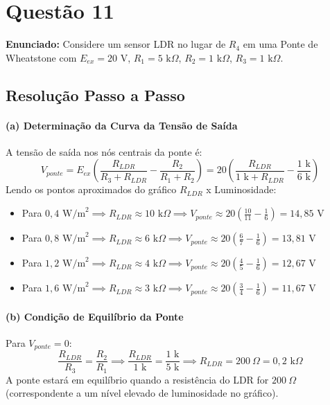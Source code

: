 \section*{Questão 11}
\textbf{Enunciado:} Considere um sensor LDR no lugar de $R_4$ em uma Ponte de Wheatstone com $E_{ex} = 20\text{ V}$, $R_1 = 5\text{ k}\Omega$, $R_2 = 1\text{ k}\Omega$, $R_3 = 1\text{ k}\Omega$.

\subsection*{Resolução Passo a Passo}

\paragraph{(a) Determinação da Curva da Tensão de Saída}
A tensão de saída nos nós centrais da ponte é:
\begin{equation*}
    V_{ponte} = E_{ex} \left( \frac{R_{LDR}}{R_3 + R_{LDR}} - \frac{R_2}{R_1 + R_2} \right) = 20 \left( \frac{R_{LDR}}{1\text{ k} + R_{LDR}} - \frac{1\text{ k}}{6\text{ k}} \right)
\end{equation*}
Lendo os pontos aproximados do gráfico $R_{LDR}$ x Luminosidade:
\begin{itemize}
    \item Para $0{,}4\text{ W/m}^2 \implies R_{LDR} \approx 10\text{ k}\Omega \implies V_{ponte} \approx 20 \left( \frac{10}{11} - \frac{1}{6} \right) = 14{,}85\text{ V}$
    \item Para $0{,}8\text{ W/m}^2 \implies R_{LDR} \approx 6\text{ k}\Omega \implies V_{ponte} \approx 20 \left( \frac{6}{7} - \frac{1}{6} \right) = 13{,}81\text{ V}$
    \item Para $1{,}2\text{ W/m}^2 \implies R_{LDR} \approx 4\text{ k}\Omega \implies V_{ponte} \approx 20 \left( \frac{4}{5} - \frac{1}{6} \right) = 12{,}67\text{ V}$
    \item Para $1{,}6\text{ W/m}^2 \implies R_{LDR} \approx 3\text{ k}\Omega \implies V_{ponte} \approx 20 \left( \frac{3}{4} - \frac{1}{6} \right) = 11{,}67\text{ V}$
\end{itemize}

\paragraph{(b) Condição de Equilíbrio da Ponte}
Para $V_{ponte} = 0$:
\begin{equation*}
    \frac{R_{LDR}}{R_3} = \frac{R_2}{R_1} \implies \frac{R_{LDR}}{1\text{ k}} = \frac{1\text{ k}}{5\text{ k}} \implies R_{LDR} = 200\ \Omega = 0{,}2\text{ k}\Omega
\end{equation*}
A ponte estará em equilíbrio quando a resistência do LDR for $200\ \Omega$ (correspondente a um nível elevado de luminosidade no gráfico).

